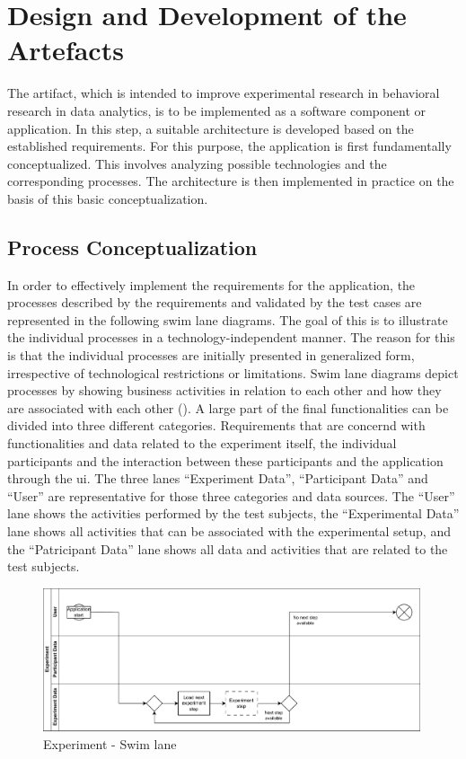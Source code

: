 \section{Design and Development of the Artefacts}\label{sec:designArtefact}

The artifact, which is intended to improve experimental research in behavioral research in data analytics, is to be implemented as a software component or application. In this step, a suitable architecture is developed based on the established requirements. For this purpose, the application is first fundamentally conceptualized. This involves analyzing possible technologies and the corresponding processes. The architecture is then implemented in practice on the basis of this basic conceptualization.

\subsection{Process Conceptualization}\label{subsec:ProcessConcept}

In order to effectively implement the requirements for the application, the processes described by the requirements and validated by the test cases are represented in the following swim lane diagrams. The goal of this is to illustrate the individual processes in a technology-independent manner. The reason for this is that the individual processes are initially presented in generalized form, irrespective of technological restrictions or limitations. Swim lane diagrams depict processes by showing business activities in relation to each other and how they are associated with each other (\cite{Caudle.2009}). A large part of the final functionalities can be divided into three different categories. Requirements that are concernd with functionalities and data related to the experiment itself, the individual participants and the interaction between these participants and the application through the \ac{ui}. The three lanes \enquote{Experiment Data}, \enquote{Participant Data} and \enquote{User} are representative for those three categories and data sources. The \enquote{User} lane shows the activities performed by the test subjects, the \enquote{Experimental Data} lane shows all activities that can be associated with the experimental setup, and the \enquote{Patricipant Data} lane shows all data and activities that are related to the test subjects. 

\begin{figure}[htbp]
    \centering
    \includegraphics[width=0.99\textwidth, keepaspectratio]{content/05_design_and_dev_artefacts/ExperimentSwimLane.drawio.pdf}
    \caption{Experiment - Swim lane}    
    \label{fig:experimentSwimLane}
\end{figure}

